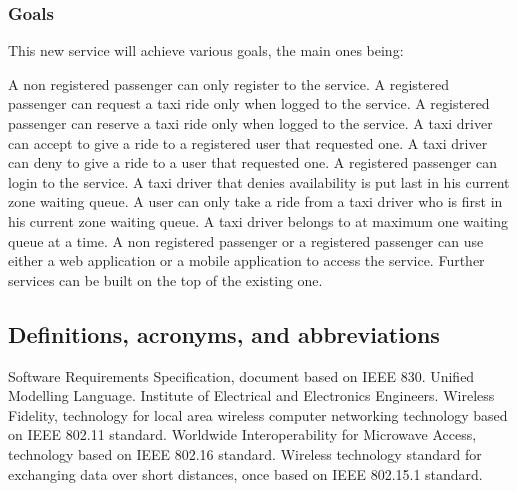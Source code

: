 \subsubsection{Goals}
This new service will achieve various goals, the main ones being:
\begin{itemize}
	 A non registered passenger can only register to the service.
	 A registered passenger can request a taxi ride only when logged to the service.
	 A registered passenger can reserve a taxi ride only when logged to the service.
	 A taxi driver can accept to give a ride to a registered user that requested one.
	 A taxi driver can deny to give a ride to a user that requested one.
	 A registered passenger can login to the service.
	 A taxi driver that denies availability is put last in his current zone waiting queue.
	 A user can only take a ride from a taxi driver who is first in his current zone waiting queue.
	 A taxi driver belongs to at maximum one waiting queue at a time.
	 A non registered passenger or a registered passenger can use either a web application or a mobile application to access the service.
	 Further services can be built on the top of the existing one.
\end{itemize}
\subsection{Definitions, acronyms, and abbreviations}
\begin{itemize}
	 Software Requirements Specification, document based on IEEE 830.
	 Unified Modelling Language.
	 Institute of Electrical and Electronics Engineers.
	 Wireless Fidelity, technology for local area wireless computer networking technology based on IEEE 802.11 standard.
	 Worldwide Interoperability for Microwave Access, technology based on IEEE 802.16 standard.
	 Wireless technology standard for exchanging data over short distances, once based on IEEE 802.15.1 standard.
\end{itemize}
